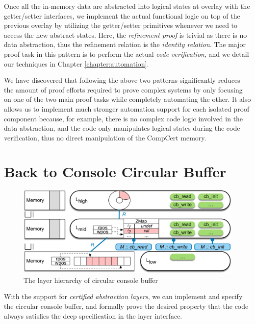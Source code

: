 Once all the in-memory data are abstracted into logical states at overlay with
the getter/setter interfaces, we implement the actual functional logic on top
of the previous overlay by utilizing the getter/setter primitives whenever
we need to access the new abstract states. Here, the {\it refinement proof}
is trivial as there is no data abstraction, thus the refinement relation is
the {\it identity relation}. The major proof task in this pattern is to perform
the actual {\it code verification}, and we detail our techniques in Chapter
\ref{chapter:automation}.

We have discovered that following the above two patterns significantly reduces the
amount of proof efforts required to prove complex systems by only focusing on one
of the two main proof tasks while completely automating the other.
It also allows us to implement much stronger automation support for each isolated
proof component because, for example, there is no complex code logic involved in the
data abstraction, and the code only manipulates logical states during the
code verification, thus no direct manipulation of the CompCert memory.


\section{Back to Console Circular Buffer}
\label{chapter:framework:console-buffer}

\begin{figure}
	\begin{center}
		\includegraphics[scale=0.6]{figs/cons_buf}
	\end{center}
	\caption{The layer hierarchy of circular console buffer}
	\label{fig:layer:cons-buf}
\end{figure}

With the support for {\it certified abstraction layers}, we can implement and
specify the circular console buffer, and formally prove the desired property
that the code always satisfies the deep specification in the layer interface.

